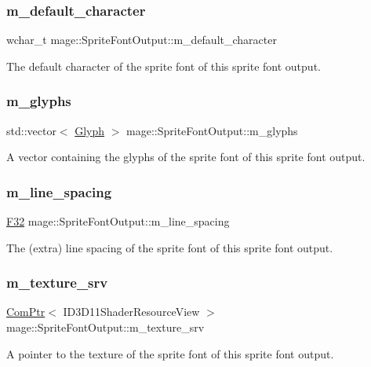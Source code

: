 \subsubsection{\texorpdfstring{m\+\_\+default\+\_\+character}{m\_default\_character}}
{\footnotesize\ttfamily wchar\+\_\+t mage\+::\+Sprite\+Font\+Output\+::m\+\_\+default\+\_\+character}

The default character of the sprite font of this sprite font output. \hypertarget{structmage_1_1_sprite_font_output_a07fbd1b16f85a2dc1c6a45e54174709c}{}\label{structmage_1_1_sprite_font_output_a07fbd1b16f85a2dc1c6a45e54174709c} 
\subsubsection{\texorpdfstring{m\+\_\+glyphs}{m\_glyphs}}
{\footnotesize\ttfamily std\+::vector$<$ \hyperlink{structmage_1_1_glyph}{Glyph} $>$ mage\+::\+Sprite\+Font\+Output\+::m\+\_\+glyphs}

A vector containing the glyphs of the sprite font of this sprite font output. \hypertarget{structmage_1_1_sprite_font_output_afa189d48c92167f6a01f63a1616b7c95}{}\label{structmage_1_1_sprite_font_output_afa189d48c92167f6a01f63a1616b7c95} 
\subsubsection{\texorpdfstring{m\+\_\+line\+\_\+spacing}{m\_line\_spacing}}
{\footnotesize\ttfamily \hyperlink{namespacemage_aa97e833b45f06d60a0a9c4fc22ae02c0}{F32} mage\+::\+Sprite\+Font\+Output\+::m\+\_\+line\+\_\+spacing}

The (extra) line spacing of the sprite font of this sprite font output. \hypertarget{structmage_1_1_sprite_font_output_abece35d0abdacf81538969a3ec8a5617}{}\label{structmage_1_1_sprite_font_output_abece35d0abdacf81538969a3ec8a5617} 
\subsubsection{\texorpdfstring{m\+\_\+texture\+\_\+srv}{m\_texture\_srv}}
{\footnotesize\ttfamily \hyperlink{namespacemage_ae74f374780900893caa5555d1031fd79}{Com\+Ptr}$<$ I\+D3\+D11\+Shader\+Resource\+View $>$ mage\+::\+Sprite\+Font\+Output\+::m\+\_\+texture\+\_\+srv}

A pointer to the texture of the sprite font of this sprite font output. 